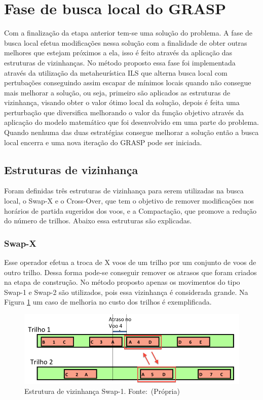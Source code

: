  \section{Fase de busca local do GRASP}

Com a finalização da etapa anterior tem-se uma solução do problema. A fase de busca
local efetua modificações nessa solução com a finalidade de obter outras
melhores que estejam próximos a ela, isso é feito através da aplicação das
estruturas de vizinhanças. No método proposto essa fase foi implementada através
da utilização da metaheurística ILS que alterna busca local com pertubações
conseguindo assim escapar de mínimos locais quando não consegue mais melhorar a
solução, ou seja, primeiro são aplicados as estruturas de vizinhança, visando
obter o valor ótimo local da solução, depois é feita uma perturbação que
diversifica melhorando o valor da função objetivo através da aplicação do
modelo matemático que foi desenvolvido em uma parte do problema. Quando nenhuma
das duas estratégias consegue melhorar a solução então a busca local encerra e
uma nova iteração do GRASP pode ser iniciada.
 
\subsection{Estruturas de vizinhança}
 
Foram definidas três estruturas de vizinhança para serem utilizadas na busca
local, o Swap-X e o Cross-Over, que tem o objetivo de remover modificações nos
horários de partida sugeridos dos voos, e a Compactação, que promove a redução
do número de trilhos. Abaixo essa estruturas são explicadas.
 
\subsubsection{Swap-X}

Esse operador efetua a troca de X voos de um trilho por um conjunto de voos de
outro trilho. Dessa forma pode-se conseguir remover os atrasos que foram criados
na etapa de construção. No método proposto apenas os movimentos do tipo Swap-1
e Swap-2 são utilizados, pois essa vizinhança é considerada grande. Na Figura
\ref{fig:swap1} um caso de melhoria no custo dos trilhos é exemplificada.

\begin{figure}[ht]
	\caption{Estrutura de vizinhança Swap-1. \mbox{Fonte:
	(Própria)}}\label{fig:swap1}
	\includegraphics[scale=0.4]{./img/swap-1}
	
\end{figure}
 
